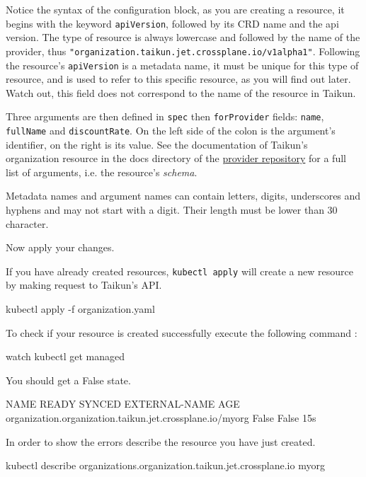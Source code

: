 \begin{tip}
Notice the syntax of the configuration block, as you are creating a resource,
it begins with the keyword \texttt{apiVersion}, followed by its CRD name and the api
version. The type of resource is always lowercase and followed by the name of the
provider, thus \texttt{"organization.taikun.jet.crossplane.io/v1alpha1"}.
Following the resource's \texttt{apiVersion} is a metadata name, it must be unique 
for this type of resource, and is used to refer to this specific resource, as you 
will find out later. Watch out, this field does not correspond to the name of the 
resource in Taikun.


Three arguments are then defined in \texttt{spec} then \texttt{forProvider} fields: \texttt{name}, \texttt{fullName} and \texttt{discountRate}.
On the left side of the colon is the argument's identifier, on the right is its value.
See the documentation of Taikun's organization resource in the docs directory of the 
\href{https://github.com/itera-io/provider-jet-taikun/}{provider repository} for a 
full list of arguments, i.e. the resource's \textit{schema}.

Metadata names and argument names can contain letters, digits, underscores and hyphens 
and may not start with a digit. Their length must be lower than 30 character.
\end{tip}

Now apply your changes.
\begin{tip}
If you have already created resources, \texttt{kubectl apply} will create a new resource
by making request to Taikun's API.
\end{tip}

\begin{shell}
kubectl apply -f organization.yaml
\end{shell}

To check if your resource is created successfully execute the following command :
\begin{shell}
watch kubectl get managed
\end{shell}

You should get a False state.
\begin{raw}
NAME                                                       READY SYNCED EXTERNAL-NAME AGE
organization.organization.taikun.jet.crossplane.io/myorg   False False                15s
\end{raw}
In order to show the errors describe the resource you have just created.
\begin{shell}
kubectl describe organizations.organization.taikun.jet.crossplane.io myorg
\end{shell}

